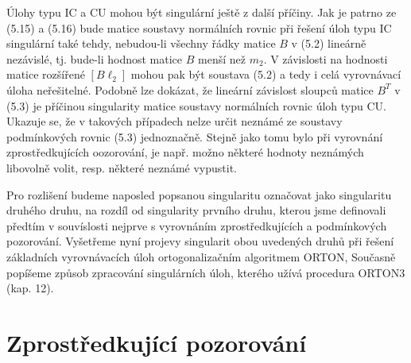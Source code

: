 Úlohy  typu IC a CU mohou být singulární ještě z další
příčiny. Jak je patrno ze (5.15) a (5.16) bude matice soustavy
normálních rovnic při řešení úloh typu IC singulární také
tehdy, nebudou-li všechny řádky matice $B$ v (5.2) lineárně
nezávislé, tj. bude-li hodnost matice $B$ menší než $m_2$. V závislosti na
hodnosti matice rozšířené $\left[B \ell_2\right]$ mohou pak být soustava (5.2)
a tedy i celá vyrovnávací úloha neřešitelné. Podobně lze dokázat,
že lineární závislost sloupců matice $B^T$ v (5.3) je příčinou
singularity matice soustavy normálních rovnic úloh typu CU. Ukazuje
se, že v takových případech nelze určit neznámé ze soustavy
podmínkových rovnic (5.3) jednoznačně. Stejně jako tomu bylo při
vyrovnání zprostředkujících oozorování, je např. možno některé
hodnoty neznámých libovolně volit, resp. některé neznámé vypustit.

Pro rozlišení budeme naposled popsanou singularitu označovat
jako singularitu druhého druhu, na rozdíl od singularity
prvního druhu, kterou jsme definovali předtím v souvíslosti nejprve
s vyrovnáním zprostředkujících a podmínkových pozorování.
Vyšetřeme nyní projevy singularit obou uvedených druhů při řešení
základních vyrovnávacích úloh ortogonalizačním algoritmem ORTON,
Současně popíšeme způsob zpracování singulárních úloh, kterého
užívá procedura ORTON3 (kap. 12).



\section{Zprostředkující pozorování}

